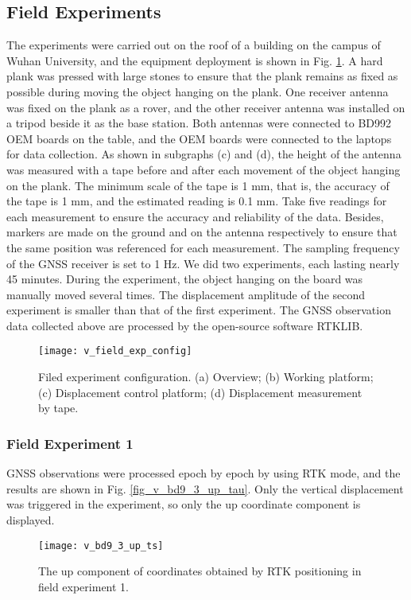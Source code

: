 \documentclass[final,3p,times]{elsarticle}
\begin{document}
	\subsection{Field Experiments}
	The experiments were carried out on the roof of a building on the campus of Wuhan University, and the equipment deployment is shown in Fig. \ref{fig_v_field_exp_config}. 
	A hard plank was pressed with large stones to ensure that the plank remains as fixed as possible during moving the object hanging on the plank. 
	One receiver antenna was fixed on the plank as a rover, and the other receiver antenna was installed on a tripod beside it as the base station. 
	Both antennas were connected to BD992 OEM boards on the table, and the OEM boards were connected to the laptops for data collection. 
	As shown in subgraphs (c) and (d), the height of the antenna was measured with a tape before and after each movement of the object hanging on the plank. 
	\textcolor{r_s}{
		The minimum scale of the tape is 1 mm, that is, the accuracy of the tape is 1 mm, and the estimated reading is 0.1 mm.
		Take five readings for each measurement to ensure the accuracy and reliability of the data.
	}
	Besides, markers are made on the ground and on the antenna respectively to ensure that the same position was referenced for each measurement. 
	The sampling frequency of the GNSS receiver is set to 1 Hz. 
	We did two experiments, each lasting nearly 45 minutes. 
	During the experiment, the object hanging on the board was manually moved several times.
	The displacement amplitude of the second experiment is smaller than that of the first experiment.
	The GNSS observation data collected above are processed by the open-source software RTKLIB\cite{takasu2011rtklib}. 
	\begin{figure}[htbp]
		\centering
		\texttt{[image: v\_field\_exp\_config]}
		\caption{Filed experiment configuration. (a) Overview; (b) Working platform; (c) Displacement control platform; (d) Displacement measurement by tape. }
		\label{fig_v_field_exp_config}
	\end{figure} 
	
	\subsubsection{Field Experiment 1}%
	GNSS observations were processed epoch by epoch by using RTK mode, and the results are shown in Fig. \ref{fig_v_bd9_3_up_tau}.
	Only the vertical displacement was triggered in the experiment, so only the up coordinate component is displayed. 
	\begin{figure}[htbp]
		\centering
		\texttt{[image: v\_bd9\_3\_up\_ts]}
		\caption{The up component of coordinates obtained by RTK positioning in field experiment 1.}
		\label{fig_v_bd9_3_up_ts}
	\end{figure} 
	
\end{document}
